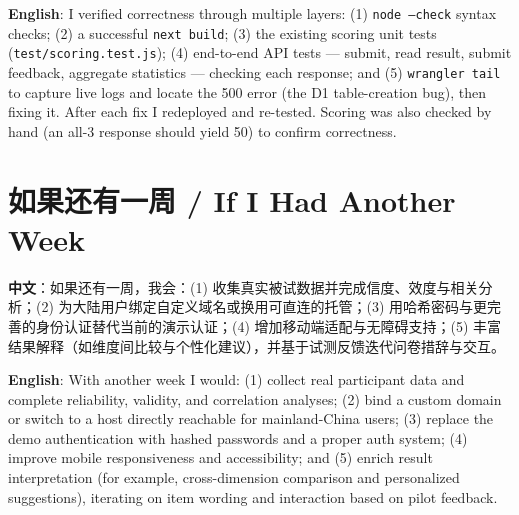 \documentclass[11pt,a4paper]{ctexart}
\begin{document}
\noindent\textbf{English}: I verified correctness through multiple layers: (1) \texttt{node --check} syntax checks; (2) a successful \texttt{next build}; (3) the existing scoring unit tests (\texttt{test/scoring.test.js}); (4) end-to-end API tests --- submit, read result, submit feedback, aggregate statistics --- checking each response; and (5) \texttt{wrangler tail} to capture live logs and locate the 500 error (the D1 table-creation bug), then fixing it. After each fix I redeployed and re-tested. Scoring was also checked by hand (an all-3 response should yield 50) to confirm correctness.

\section{如果还有一周 / If I Had Another Week}

\noindent\textbf{中文}：如果还有一周，我会：(1) 收集真实被试数据并完成信度、效度与相关分析；(2) 为大陆用户绑定自定义域名或换用可直连的托管；(3) 用哈希密码与更完善的身份认证替代当前的演示认证；(4) 增加移动端适配与无障碍支持；(5) 丰富结果解释（如维度间比较与个性化建议），并基于试测反馈迭代问卷措辞与交互。

\medskip

\noindent\textbf{English}: With another week I would: (1) collect real participant data and complete reliability, validity, and correlation analyses; (2) bind a custom domain or switch to a host directly reachable for mainland-China users; (3) replace the demo authentication with hashed passwords and a proper auth system; (4) improve mobile responsiveness and accessibility; and (5) enrich result interpretation (for example, cross-dimension comparison and personalized suggestions), iterating on item wording and interaction based on pilot feedback.
\end{document}
